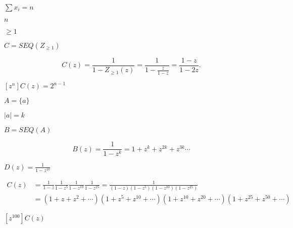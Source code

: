 \documentclass[10pt]{book}
\begin{document}
\begin{mdSnippets}
\begin{mdInlineSnippet}[4edcda6935374226723f6450855eb43b]%
$\sum x_i = n$\end{mdInlineSnippet}%
\begin{mdInlineSnippet}[7b8b965ad4bca0e41ab51de7b31363a1]%
$n$\end{mdInlineSnippet}%
\begin{mdInlineSnippet}[190e98cf0a6ba7a8b6ed2eafbfb4e8ea]%
$\geq 1$\end{mdInlineSnippet}%
\begin{mdInlineSnippet}%
$C=SEQ(Z_{\geq1})$\end{mdInlineSnippet}%
\begin{mdDisplaySnippet}[36219a14f7414d3c3884512d6012ec17]%
\[%
 C(z)=\frac{1}{1-Z_{\geq1}(z)}=\frac{1}{1-\frac{z}{1-z}}=\frac{1-z}{1-2z}.
\]%
\end{mdDisplaySnippet}%
\begin{mdInlineSnippet}[4bb8eae0518784707e4f9d6a8d60e295]%
$[z^n]C(z)=2^{n-1}$\end{mdInlineSnippet}%
\begin{mdInlineSnippet}[0f5695a0c392b0bcdebbee6d6e48b350]%
$A = \{a\}$\end{mdInlineSnippet}%
\begin{mdInlineSnippet}%
$|a|=k$\end{mdInlineSnippet}%
\begin{mdInlineSnippet}[15af214fd464bd95c3425b8abb68159e]%
$B=SEQ(A)$\end{mdInlineSnippet}%
\begin{mdDisplaySnippet}%
\[%
B(z) = \frac{1}{1-z^k}=1+z^k+z^{2k}+z^{3k}\cdots
\]%
\end{mdDisplaySnippet}%
\begin{mdInlineSnippet}%
$D(z)=\frac{1}{1-z^{10}}$\end{mdInlineSnippet}%
\begin{mdDisplaySnippet}[2e6e301c4cec00c0d0a1ae25194b04dd]%
\[%
\begin{aligned} 
C(z)&=\frac{1}{1-z}\frac{1}{1-z^5}\frac{1}{1-z^{10}}\frac{1}{1-z^{25}}
    =\frac{1}{(1-z)(1-z^5)(1-z^{10})(1-z^{25})}\\
    &=(1+z+z^2+\cdots)(1 + z^5 + z^{10} + \cdots)(1 + z^{10}+z^{20}+\cdots)(
      1+z^{25}+z^{50} + \cdots)
\end{aligned}
\]%
\end{mdDisplaySnippet}%
\begin{mdInlineSnippet}[d01a6119f94a8fdc0d5bd229fb83ae2e]%
$[z^{100}]C(z)$\end{mdInlineSnippet}%

\end{mdSnippets}
\end{document}
